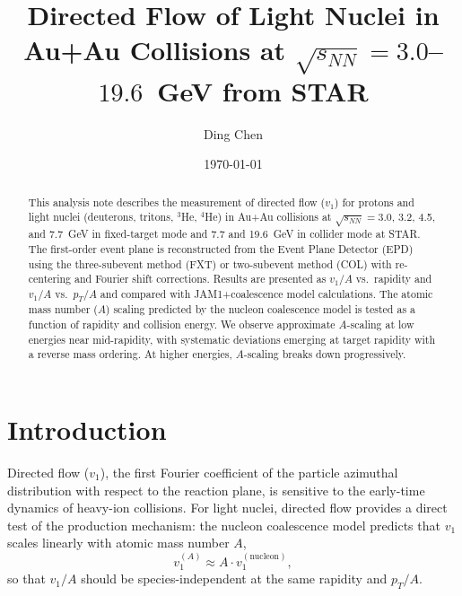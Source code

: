 \documentclass[aps,prc,preprint,superscriptaddress,nofootinbib]{revtex4-2}
\begin{document}
\title{Directed Flow of Light Nuclei in Au+Au Collisions at $\sqrt{s_{NN}} = 3.0$--$19.6$~GeV from STAR}

\author{Ding Chen}


\date{\today}

\begin{abstract}
This analysis note describes the measurement of directed flow ($v_1$) for protons and light nuclei (deuterons, tritons, $^3$He, $^4$He) in Au+Au collisions at $\sqrt{s_{NN}} = 3.0$, 3.2, 4.5, and 7.7~GeV in fixed-target mode and 7.7 and 19.6~GeV in collider mode at STAR. The first-order event plane is reconstructed from the Event Plane Detector (EPD) using the three-subevent method (FXT) or two-subevent method (COL) with re-centering and Fourier shift corrections. Results are presented as $v_1/A$ vs.\ rapidity and $v_1/A$ vs.\ $p_T/A$ and compared with JAM1+coalescence model calculations. The atomic mass number ($A$) scaling predicted by the nucleon coalescence model is tested as a function of rapidity and collision energy. We observe approximate $A$-scaling at low energies near mid-rapidity, with systematic deviations emerging at target rapidity with a reverse mass ordering. At higher energies, $A$-scaling breaks down progressively.
\end{abstract}

\maketitle
\tableofcontents

\section{Introduction}
\label{sec:intro}

Directed flow ($v_1$), the first Fourier coefficient of the particle azimuthal distribution with respect to the reaction plane, is sensitive to the early-time dynamics of heavy-ion collisions. For light nuclei, directed flow provides a direct test of the production mechanism: the nucleon coalescence model predicts that $v_1$ scales linearly with atomic mass number $A$,
\begin{equation}
    v_1^{(A)} \approx A \cdot v_1^{(\text{nucleon})},
    \label{eq:ascaling}
\end{equation}
so that $v_1/A$ should be species-independent at the same rapidity and $p_T/A$.
\end{document}
